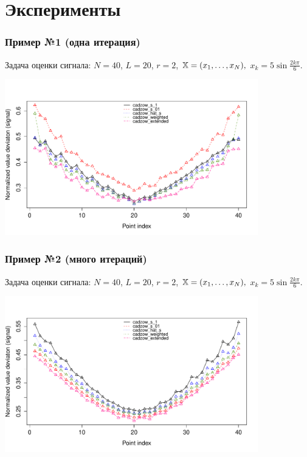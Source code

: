 \documentclass[unicode, notheorems]{beamer}
\begin{document}
\section{Эксперименты}
\begin{frame}
  \frametitle{Пример №1 (одна итерация)}
  Задача оценки сигнала: $N = 40$, $L = 20$, $r = 2$, $\mathbb{X} = (x_{1}, \ldots, x_N),$  $x_k = 5\sin{\frac{2 k \pi}{6}}$.

\includegraphics*[width = 11cm]{s1_it1.pdf}

\end{frame}

\begin{frame}
  \frametitle{Пример №2 (много итераций)}
  Задача оценки сигнала: $N = 40$, $L = 20$, $r = 2$, $\mathbb{X} = (x_{1}, \ldots, x_N),$  $x_k = 5\sin{\frac{2 k \pi}{6}}$.

\includegraphics*[width = 11cm]{s1_it100.pdf}

\end{frame}
\end{document}
